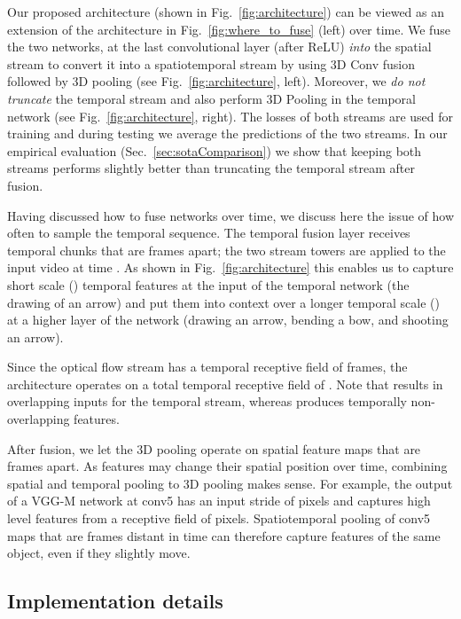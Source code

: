 \documentclass[10pt,twocolumn,letterpaper]{article}
\begin{document}
Our proposed architecture (shown in Fig.~\ref{fig:architecture}) can
be viewed as an extension of the architecture in
Fig.~\ref{fig:where_to_fuse} (left) over time. We fuse the two
networks, at the last convolutional layer (after ReLU) {\em into} the
spatial stream to convert it into a spatiotemporal stream by using 3D
Conv fusion followed by 3D pooling (see Fig.~\ref{fig:architecture},
left).  Moreover, we {\em do not truncate} the temporal stream and
also perform 3D Pooling in the temporal network (see
Fig.~\ref{fig:architecture}, right). The losses of both streams are
used for training and during testing we average the predictions of the
two streams. In our empirical evaluation
(Sec.~\ref{sec:sotaComparison}) we show that keeping both streams
performs slightly better than truncating the temporal stream after
fusion.

Having discussed how to fuse networks over time, we discuss
here the issue of how often to sample the temporal sequence.
The temporal fusion layer receives  temporal chunks that are  frames apart; \ie the two stream towers are applied to the input video at time .
As shown in Fig.~\ref{fig:architecture} this enables us to capture short scale () temporal features at the input of the temporal network (\eg the drawing of an arrow) and put
them into context over a longer temporal scale () at a higher
layer of the network (\eg drawing an arrow, bending a bow, and
shooting an arrow).  

Since the optical flow stream has a temporal receptive field of  frames, the architecture operates on a total temporal receptive field of . 
Note that  results in overlapping inputs for the temporal stream, whereas  produces temporally non-overlapping features.

After fusion, we let the 3D pooling operate on  spatial feature maps
that are  frames apart. As features may change their spatial
position over time, combining spatial and temporal pooling to 3D
pooling makes sense. For example, the output of a VGG-M network at conv5 has
an input stride of  pixels and captures high level features from a
receptive field of  pixels. Spatiotemporal pooling
of conv5 maps that are  frames distant in time can therefore capture
features of the same object, even if they slightly move.


\subsection{Implementation details} \label{sec:implementation details}
\end{document}
